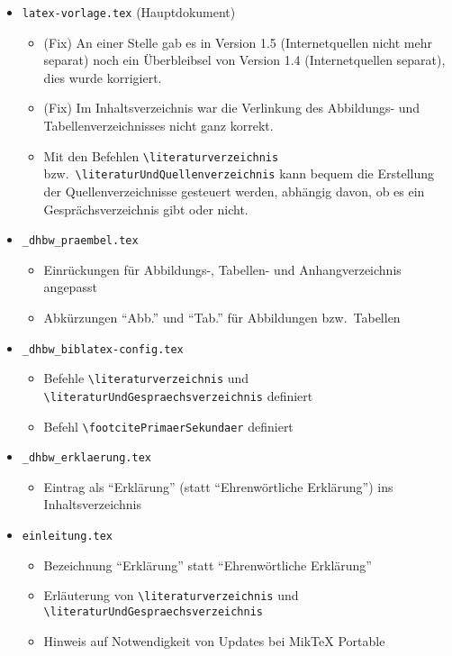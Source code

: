 \begin{itemize}
\item \verb|latex-vorlage.tex| (Hauptdokument)
\begin{itemize}
\item (Fix) An einer Stelle gab es in Version 1.5 (Internetquellen nicht mehr separat) noch ein Überbleibsel von Version 1.4 (Internetquellen separat), dies wurde korrigiert.
\item (Fix) Im Inhaltsverzeichnis war die Verlinkung des Abbildungs- und Tabellenverzeich\-nisses nicht ganz korrekt.
\item Mit den Befehlen \verb|\literaturverzeichnis| bzw.\ \verb|\literaturUndQuellenverzeichnis| kann bequem die Erstellung der Quellenverzeichnisse gesteuert werden, abhängig davon, ob es ein Gesprächsverzeichnis gibt oder nicht.
 
\end{itemize}

\item \verb|_dhbw_praembel.tex|
\begin{itemize}
\item Einrückungen für Abbildungs-, Tabellen- und Anhangverzeichnis angepasst
\item Abkürzungen \enquote{Abb.} und \enquote{Tab.} für Abbildungen bzw.\ Tabellen
\end{itemize}

\item \verb|_dhbw_biblatex-config.tex|
\begin{itemize}
\item Befehle \verb|\literaturverzeichnis| und \verb|\literaturUndGespraechsverzeichnis| definiert
\item Befehl \verb|\footcitePrimaerSekundaer| definiert
\end{itemize}

\item \verb|_dhbw_erklaerung.tex|
\begin{itemize}
\item Eintrag als \enquote{Erklärung} (statt \enquote{Ehrenwörtliche Erklärung}) ins Inhaltsverzeichnis
\end{itemize}

\item \verb|einleitung.tex|
\begin{itemize}
\item Bezeichnung \enquote{Erklärung} statt \enquote{Ehrenwörtliche Erklärung}
\item Erläuterung von \verb|\literaturverzeichnis| und \verb|\literaturUndGespraechsverzeichnis|
\item Hinweis auf Notwendigkeit von Updates bei MikTeX Portable
\end{itemize}


\end{itemize}
